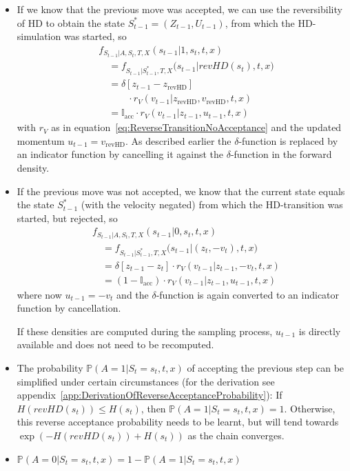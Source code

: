 \begin{itemize}
\item If we know that the previous move was accepted, we can use the reversibility of HD to obtain the state $S_{t-1}^* = (Z_{t-1}, U_{t-1})$, from which the HD-simulation was started, so
\begin{equation}
\begin{split}
&f_{S_{t-1} |A, S_t, T, X}(s_{t-1} | 1, s_t, t, x) \\
&\quad= f_{S_{t-1} |S_{t-1}^*, T, X}\big(s_{t-1} | revHD(s_t), t, x\big) \\
&\quad= \delta \left[z_{t-1} - z_{\textrm{revHD}} \right] \\
&\quad\qquad \cdot r_V(v_{t-1}|z_{\textrm{revHD}}, v_{\textrm{revHD}}, t, x) \\
&\quad= \mathbb{I}_\textrm{acc} \cdot r_V(v_{t-1}|z_{t-1}, u_{t-1}, t, x) 
\end{split}
\end{equation}
with $r_V$ as in equation~\eqref{eq:ReverseTransitionNoAcceptance} and the updated momentum $u_{t-1} = v_{\textrm{revHD}}$. As described earlier the $\delta$-function is replaced by an indicator function by cancelling it against the $\delta$-function in the forward density.
\item If the previous move was not accepted, we know that the current state equals the state $S_{t-1}^*$ (with the velocity negated) from which the HD-transition was started, but rejected, so
\begin{equation}
\begin{split}
&f_{S_{t-1} |A, S_t, T, X}(s_{t-1} | 0, s_t, t, x) \\
&\quad= f_{S_{t-1} |S_{t-1}^*, T, X}\big(s_{t-1} | (z_t, -v_t), t, x\big) \\
&\quad= \delta \left[z_{t-1} - z_{t} \right] \cdot r_V(v_{t-1}|z_{t-1}, -v_t, t, x) \\
&\quad= (1 - \mathbb{I}_\textrm{acc}) \cdot r_V(v_{t-1}| z_{t-1}, u_{t-1}, t, x)
\end{split}
\end{equation}
where now $u_{t-1} = -v_t$ and the $\delta$-function is again converted to an indicator function by cancellation.

If these densities are computed during the sampling process, $u_{t-1}$ is directly available and does not need to be recomputed.
\item The probability $\mathbb{P}(A = 1|S_t = s_t, t, x)$ of accepting the previous step can be simplified under certain circumstances (for the derivation see appendix~\ref{app:DerivationOfReverseAcceptanceProbability}): If $H(revHD(s_t)) \leq H(s_t)$, then $\mathbb{P}(A = 1|S_t = s_t, t, x) = 1$. Otherwise, this reverse acceptance probability needs to be learnt, but will tend towards $\exp(-H(revHD(s_t)) + H(s_t))$ as the chain converges. 
\item $\mathbb{P}(A = 0|S_t = s_t, t, x) = 1 - \mathbb{P}(A = 1|S_t = s_t, t, x)$
\end{itemize}

